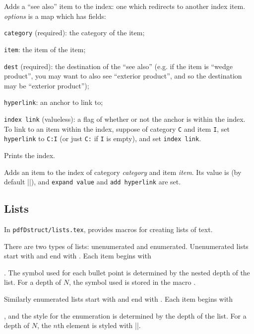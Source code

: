 Adds a ``see also'' item to the index: one which redirects to another index item.
{\it options} is a map which has fields:
\benum
    \item {\tt category} (required): the category of the item;
    \item {\tt item}: the item of the item;
    \item {\tt dest} (required): the destination of the ``see also'' (e.g. if the item is ``wedge product'', you may want to also see ``exterior product'', and so the destination may be ``exterior product'');
    \item {\tt hyperlink}: an anchor to link to;
    \item {\tt index link} (valueless): a flag of whether or not the anchor is within the index.
\eenum
To link to an item within the index, suppose of category {\tt C} and item {\tt I}, set {\tt hyperlink} to {\tt C:I} (or just {\tt C:} if {\tt I} is empty), and set {\tt index link}.
\emacroexp

\macroexp{\index}
Prints the index.
\emacroexp

Adds an item to the index of category {\it category} and item {\it item}.
Its value is \macro\@defaultindexval{} (by default \inlinecode|\the\pageno|), and {\tt expand value} and {\tt add hyperlink} are set.
\emacroexp

\subsection{Lists}

In {\tt pdfDstruct/lists.tex}, \pdftoolbox{} provides macros for creating lists of text.

There are two types of lists: unenumerated and enumerated.
Unenumerated lists start with \macro\blist\anchormacro\blist{} and end with \macro\elist\anchormacro\elist.
Each item begins with \macro\item\anchormacro\item.
The symbol used for each bullet point is determined by the nested depth of the list.
For a depth of $N$, the symbol used is stored in the macro \macro\liststyleN\anchormacro\liststyle.

Similarly enumerated lists start with \macro\benum\anchormacro\benum{} and end with \macro\elist\anchormacro\eenum.
Each item begins with \macro\item, and the style for the enumeration is determined by the depth of the list.
For a depth of $N$, the $n$th element is styled with \inlinecode||.

